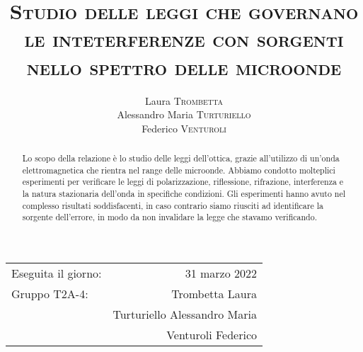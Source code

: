 \documentclass[a4paper,12pt, italian]{article}
\title{\textsc{Studio delle leggi che governano le inteterferenze con sorgenti nello spettro delle microonde}}
\date{}
\author{Laura \textsc{Trombetta}\\ Alessandro Maria \textsc{Turturiello}\\Federico \textsc{Venturoli}}
\begin{document}
\maketitle 

\begin{center}
\begin{tabular}{l r}
Eseguita il giorno: &  31 marzo 2022 \\ 
Gruppo T2A-4: & Trombetta Laura\\
& Turturiello Alessandro Maria \\
& Venturoli Federico \\ 

\end{tabular}
\end{center}
\begin{abstract}
    Lo scopo della relazione è lo studio delle leggi dell'ottica, grazie all'utilizzo di un'onda elettromagnetica che rientra nel range delle microonde.
    Abbiamo condotto molteplici esperimenti per verificare le leggi di polarizzazione, riflessione, rifrazione, interferenza e la natura stazionaria dell'onda in specifiche condizioni. Gli esperimenti hanno avuto nel complesso risultati soddisfacenti, in caso contrario siamo riusciti ad identificare la sorgente dell'errore, in modo da non invalidare la legge che stavamo verificando. 
\end{abstract}
\tableofcontents
\maketitle
\newpage








\end{document}
